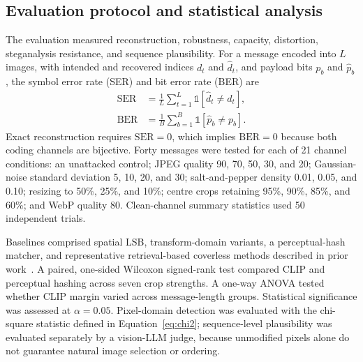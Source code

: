 \documentclass[10pt,a4paper]{article}
\theoremstyle{definition}
\begin{document}
\subsection{Evaluation protocol and statistical analysis}\label{sec:protocol}
The evaluation measured reconstruction, robustness, capacity, distortion,
steganalysis resistance, and sequence plausibility. For a message encoded into
$L$ images, with intended and recovered indices $d_t$ and $\hat d_t$, and payload
bits $p_b$ and $\hat p_b$, the symbol error rate (SER) and bit error rate (BER) are
\begin{equation}
  \begin{aligned}
  \mathrm{SER}&=\frac{1}{L}\sum_{t=1}^{L}\mathbb{1}[\hat d_t\ne d_t],\\
  \mathrm{BER}&=\frac{1}{B}\sum_{b=1}^{B}\mathbb{1}[\hat p_b\ne p_b].
  \end{aligned}
  \label{eq:ber}
\end{equation}
Exact reconstruction requires $\mathrm{SER}=0$, which implies $\mathrm{BER}=0$
because both coding channels are bijective. Forty messages were tested for each
of 21 channel conditions: an unattacked control; JPEG quality 90, 70, 50, 30, and
20; Gaussian-noise standard deviation 5, 10, 20, and 30; salt-and-pepper density
0.01, 0.05, and 0.10; resizing to 50\%, 25\%, and 10\%; centre crops retaining
95\%, 90\%, 85\%, and 60\%; and WebP quality 80. Clean-channel summary statistics
used 50 independent trials.

Baselines comprised spatial LSB, transform-domain variants, a perceptual-hash
matcher, and representative retrieval-based coverless methods described in prior
work~\cite{chan2004,westfeld2001f5,subramanian,mandal,qin,mengReview}. A paired,
one-sided Wilcoxon signed-rank test compared CLIP and perceptual hashing across
seven crop strengths. A one-way ANOVA tested whether CLIP margin varied across
message-length groups. Statistical significance was assessed at $\alpha=0.05$.
Pixel-domain detection was evaluated with the chi-square statistic defined in
Equation~\eqref{eq:chi2}; sequence-level plausibility was evaluated separately by
a vision-LLM judge, because unmodified pixels alone do not guarantee natural image
selection or ordering.

\end{document}
